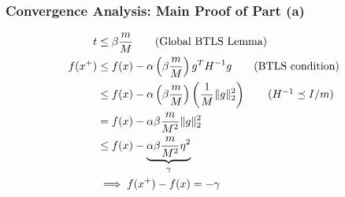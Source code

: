 \documentclass{beamer}
\begin{document}
\begin{frame}
    \frametitle{Convergence Analysis: Main Proof of Part (a)} 
	\begin{align}
	t &\leq \beta \frac{m}{M} \tag{Global BTLS Lemma} \\
	f(x^+) &\leq f(x) - \alpha\left(\beta \frac{m}{M} \right) g^T H^{-1} g \tag{BTLS condition} \\
	&\leq f(x) - \alpha\left(\beta \frac{m}{M} \right) \left(\frac{1}{M}\|g\|_2^2 \right) \tag{$H^{-1} \preceq I/m$} \\
	&= f(x) - \alpha\beta \frac{m}{M^2}\|g\|_2^2 \notag \\
	&\le f(x) - \underbrace{\alpha\beta \frac{m}{M^2} \eta^2}_{\gamma} \\
	&\implies f(x^+) - f(x) = - \gamma
	\end{align}
\end{frame}
\end{document}
